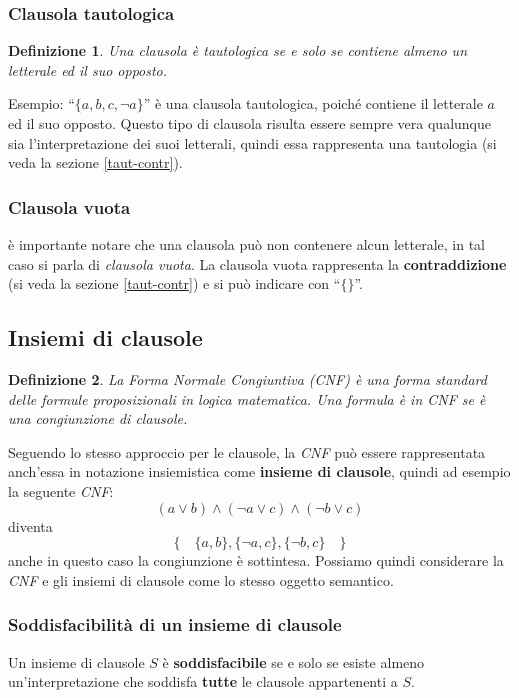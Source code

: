 \documentclass[a4paper,12pt]{report}
\newtheorem{definition}{Definizione}[section]
\begin{document}
\subsubsection{Clausola tautologica}
\begin{definition}
    Una clausola è tautologica se e solo se contiene almeno un letterale ed il suo opposto.
\end{definition}
\noindent Esempio: ``$\{ a, b, c, \lnot a \}$'' è una clausola tautologica, poiché contiene il letterale $a$ ed il suo opposto. Questo tipo di clausola risulta essere sempre vera qualunque sia l'interpretazione dei suoi letterali, quindi essa rappresenta una tautologia (si veda la sezione \ref{taut-contr}).

\subsubsection{Clausola vuota}
è importante notare che una clausola può non contenere alcun letterale, in tal caso si parla di \emph{clausola vuota}. La clausola vuota rappresenta la \textbf{contraddizione} (si veda la sezione \ref{taut-contr}) e si può indicare con ``$\{ \}$''.

\subsection{Insiemi di clausole}
\begin{definition}
    La Forma Normale Congiuntiva (CNF) è una forma standard delle formule proposizionali in logica matematica. Una formula è in CNF se è una congiunzione di clausole.
\end{definition}
\noindent Seguendo lo stesso approccio per le clausole, la \emph{CNF} può essere rappresentata anch'essa in notazione insiemistica come \textbf{insieme di clausole}, quindi ad esempio la seguente \emph{CNF}:
\[ (a \lor b) \land (\lnot a \lor c) \land (\lnot b \lor c) \]
diventa
\[\{ \quad \{a, b\}, \{\lnot a, c\}, \{\lnot b, c\} \quad \}\]
anche in questo caso la congiunzione è sottintesa. Possiamo quindi considerare la \emph{CNF} e gli insiemi di clausole come lo stesso oggetto semantico.

\subsubsection{Soddisfacibilità di un insieme di clausole}
Un insieme di clausole $S$ è \textbf{soddisfacibile} se e solo se esiste almeno un'interpretazione che soddisfa \textbf{tutte} le clausole appartenenti a $S$.
\end{document}
